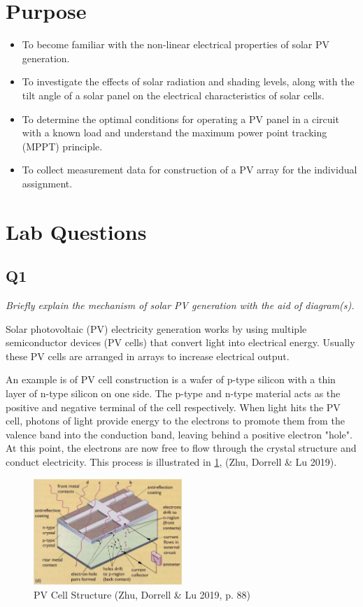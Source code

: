 \documentclass{article}
\begin{document}
	
	
	\tableofcontents
	\newpage
	\listoffigures
	\listoftables
	\newpage
	
	\section{Purpose}
		\begin{itemize}
			\item To become familiar with the non-linear electrical properties of solar PV generation.
			\item To investigate the effects of solar radiation and shading levels, along with the tilt angle of a solar panel on the electrical characteristics of solar cells.
			\item To determine the optimal conditions for operating a PV panel in a circuit with a known load and understand the maximum power point tracking (MPPT) principle.
			\item To collect measurement data for construction of a PV array for the individual assignment.
		\end{itemize}
	
	\section{Lab Questions}
	\subsection{Q1}
		\textit{Briefly explain the mechanism of solar PV generation with the aid of diagram(s).}
		
		Solar photovoltaic (PV) electricity generation works by using multiple semiconductor devices (PV cells) that convert light into electrical energy. Usually these PV cells are arranged in arrays to increase electrical output.
		
		An example is of PV cell construction is a wafer of p-type silicon with a thin layer of n-type silicon on one side. The p-type and n-type material acts as the positive and negative terminal of the cell respectively. When light hits the PV cell, photons of light provide energy to the electrons to promote them from the valence band into the conduction band, leaving behind a positive electron "hole". At this point, the electrons are now free to flow through the crystal structure and conduct electricity. This process is illustrated in \cref{fig:PVCellStructure}, (Zhu, Dorrell \& Lu 2019).
		
		\begin{figure}[H]
			\centering
			\includegraphics[width=0.5\textwidth]{PVCellStructure}
			\caption{PV Cell Structure (Zhu, Dorrell \& Lu 2019, p. 88)}
			\label{fig:PVCellStructure}
		\end{figure}
	
\end{document}
